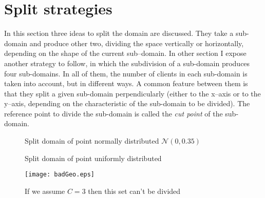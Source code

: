 
\section{Split strategies}

In this section three ideas to split the domain are discussed. They take a sub-domain and produce other two, dividing the space vertically or horizontally, depending on the shape of the current sub--domain. In other section I expose another strategy to follow, in which the subdivision of a sub-domain produces four sub-domains. In all of them, the number of clients in each sub-domain is taken into account, but in different ways. A common feature between them is that they split a given sub-domain perpendicularly (either to the x--axis or to the y--axis, depending on the characteristic of the sub-domain to be divided). The reference point to divide the sub-domain is called the {\it cut point} of the sub-domain.

\begin{figure}
	\centering
	\hspace{3pt}%
	\hspace{3pt}%
	\caption[]{Split domain of point normally distributed $\mathcal{N}\left(0,0.35\right)$}%
	\label{split:norm}
\end{figure}

\begin{figure}
	\centering
	\hspace{3pt}%
	\hspace{3pt}%
	\caption[]{Split domain of point uniformly distributed}%
	\label{split:unif}
\end{figure}

\begin{figure}
	\centering
	\texttt{[image: badGeo.eps]}
	\caption[]{If we assume $C = 3$ then this set can't be divided}%
	\label{fig:badGeom}
\end{figure}

